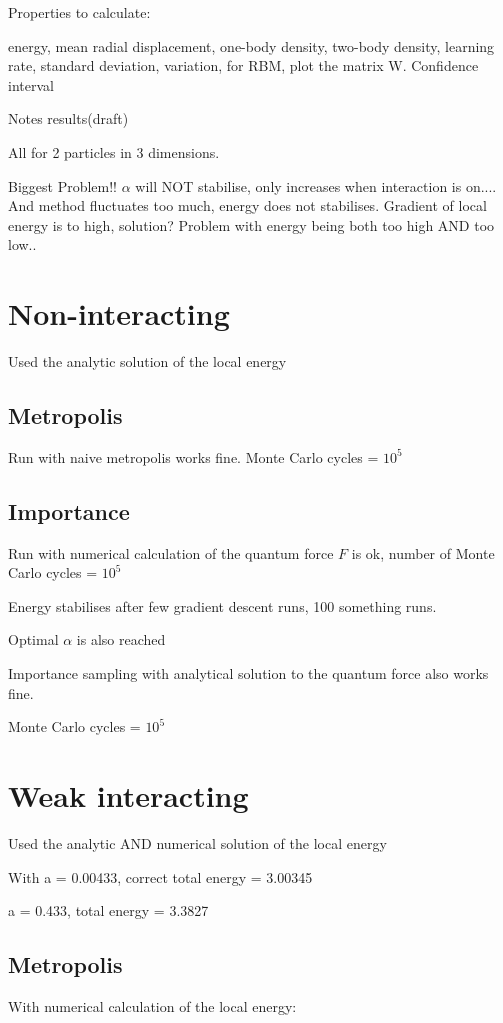Properties to calculate:

energy, mean radial displacement, one-body density, two-body density, learning rate, standard deviation, variation, for RBM, plot the matrix W.
Confidence interval 

Notes results(draft)

All for 2 particles in 3 dimensions.

Biggest Problem!! $\alpha$ will NOT stabilise, only increases when interaction is on....  
And method fluctuates too much, energy does not stabilises. Gradient of local energy is to high, solution? 
Problem with energy being both too high AND too low..

\section{Non-interacting}
Used the analytic solution of the local energy
\subsection{Metropolis}
Run with naive metropolis works fine. 
Monte Carlo cycles = $10^5$


\subsection{Importance}
Run with numerical calculation of the quantum force $F$ is ok, number of Monte Carlo cycles = $10^5$

Energy stabilises after few gradient descent runs, 100 something runs. 

Optimal $\alpha$ is also reached

Importance sampling with analytical solution to the quantum force also works fine. 

Monte Carlo cycles = $10^5$

\section{Weak interacting}
Used the analytic AND numerical solution of the local energy

With a = 0.00433, correct total energy = 3.00345

a = 0.433, total energy = 3.3827
\subsection{Metropolis}
With numerical calculation of the local energy:

